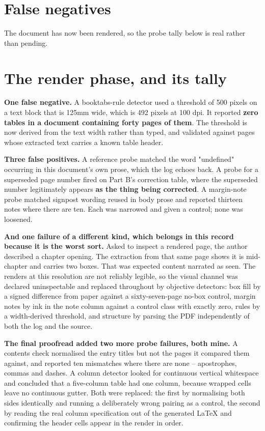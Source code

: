 \section*{False negatives}

The document has now been rendered, so the probe tally below is real rather than pending.

\section*{The render phase, and its tally}

\textbf{One false negative.} A booktabs-rule detector used a threshold of 500 pixels on a text block that is 125mm wide, which is 492 pixels at 100 dpi. It reported \textbf{zero tables in a document containing forty pages of them}. The threshold is now derived from the text width rather than typed, and validated against pages whose extracted text carries a known table header.

\textbf{Three false positives.} A reference probe matched the word "undefined" occurring in this document's own prose, which the log echoes back. A probe for a superseded page number fired on Part B's correction table, where the superseded number legitimately appears \textbf{as the thing being corrected}. A margin-note probe matched signpost wording reused in body prose and reported thirteen notes where there are ten. Each was narrowed and given a control; none was loosened.

\textbf{And one failure of a different kind, which belongs in this record because it is the worst sort.} Asked to inspect a rendered page, the author described a chapter opening. The extraction from that same page shows it is mid-chapter and carries two boxes. That was expected content narrated as seen. The renders at this resolution are not reliably legible, so the visual channel was declared uninspectable and replaced throughout by objective detectors: box fill by a signed difference from paper against a sixty-seven-page no-box control, margin notes by ink in the note column against a control class with exactly zero, rules by a width-derived threshold, and structure by parsing the PDF independently of both the log and the source.

\textbf{The final proofread added two more probe failures, both mine.} A contents check normalised the entry titles but not the pages it compared them against, and reported ten mismatches where there are none -- apostrophes, commas and dashes. A column detector looked for continuous vertical whitespace and concluded that a five-column table had one column, because wrapped cells leave no continuous gutter. Both were replaced: the first by normalising both sides identically and running a deliberately wrong pairing as a control, the second by reading the real column specification out of the generated LaTeX and confirming the header cells appear in the render in order.

